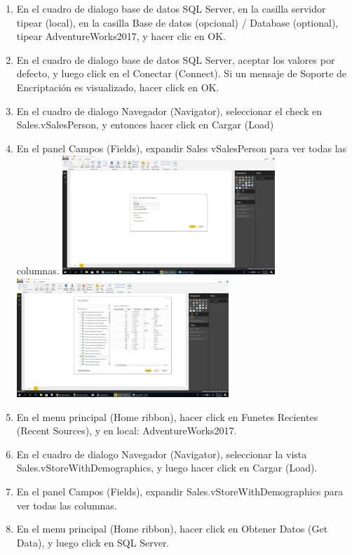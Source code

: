 \begin{itemize}
\begin{enumerate}
\item En el cuadro de dialogo base de datos SQL Server, en la casilla servidor tipear (local), en la casilla Base de
datos (opcional) / Database (optional), tipear AdventureWorks2017, y hacer clic en OK.
\item En el cuadro de dialogo base de datos SQL Server, aceptar los valores por defecto, y luego click en el
Conectar (Connect). Si un mensaje de Soporte de Encriptación es visualizado, hacer click en OK.
\item En el cuadro de dialogo Navegador (Navigator), seleccionar el check en Sales.vSalesPerson, y entonces hacer
click en Cargar (Load)
\item En el panel Campos (Fields), expandir Sales vSalesPerson para ver todas las columnas. 
\includegraphics[width=8cm]{./Imagenes/3.png} \includegraphics[width=8cm]{./Imagenes/4.png}

\item En el menu principal (Home ribbon), hacer click en Funetes Recientes (Recent Sources), y en local:
AdventureWorks2017. 

\item En el cuadro de dialogo Navegador (Navigator), seleccionar la vista Sales.vStoreWithDemographics, y luego
hacer click en Cargar (Load).
\item  En el panel Campos (Fields), expandir Sales.vStoreWithDemographics para ver todas las columnas.
\item En el menu principal (Home ribbon), hacer click en Obtener Datos (Get Data), y luego click en SQL Server. 


\end{enumerate}
\end{itemize}
